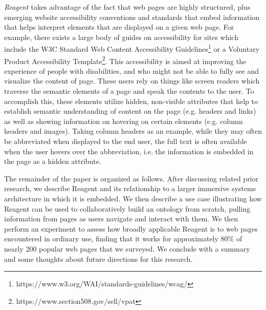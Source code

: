 \textit{Reagent} takes advantage of the fact that web pages are highly structured, plus
emerging website accessibility conventions and standards that embed
information that helps interpret elements that are displayed on a given web page. 
For example, there exists a large body of guides on accessibility for sites which include the W3C Standard
Web Content Accessibility  
Guidelines\footnote{https://www.w3.org/WAI/standards-guidelines/wcag/} or a
Voluntary Product Accessibility 
Template\footnote{https://www.section508.gov/sell/vpat}. This accessibility
is aimed at improving the experience of people with disabilities, and who might
not be able to fully see and visualize the content of page. These users rely
on things like screen readers which traverse the semantic elements of a page
and speak the contents to the user. To accomplish this, these elements utilize
hidden, non-visible attributes that help to establish semantic understanding of
content on the page (e.g. headers and links) as well as showing information on
hovering on certain elements (e.g. column headers and images). Taking column headers as an example, 
while they may often be abbreviated when displayed to the end user, the full text is often available
when the user hovers over the abbreviation, i.e. the information is embedded in the page as a hidden attribute.

The remainder of the paper is organized as follows. After discussing related prior research, we describe
Reagent and its relationship to a larger immersive systems architecture in which it is embedded. We then describe a use case illustrating
how Reagent can be used to collaboratively build an ontology from scratch, pulling information from pages as users navigate and interact with them. We then perform an experiment to assess how broadly
applicable Reagent is to web pages encountered in ordinary use, finding that it works for approximately 80\% of nearly 200 popular web pages that we surveyed.
We conclude with a summary and some thoughts about future directions for this research.